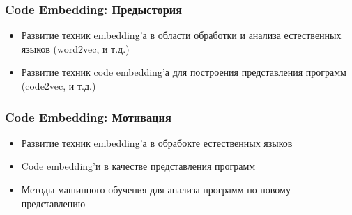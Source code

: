 \documentclass[xcolor=table,english]{beamer}
\begin{document}
\begin{frame}[fragile] \frametitle{Code Embedding: Предыстория}
    \begin{itemize}
        \item Развитие техник embedding'а в области обработки и анализа естественных языков (word2vec, и т.д.)
        \item Развитие техник code embedding'а для построения представления программ (code2vec, и т.д.)
    \end{itemize}
\end{frame}

\begin{frame}[fragile] \frametitle{Code Embedding: Мотивация}
    \begin{itemize}
        \item Развитие техник embedding'а в обрабокте естественных языков
        \item Code embedding'и в качестве представления программ
        \item Методы машинного обучения для анализа программ по новому представлению
    \end{itemize}
\end{frame}
\end{document}
